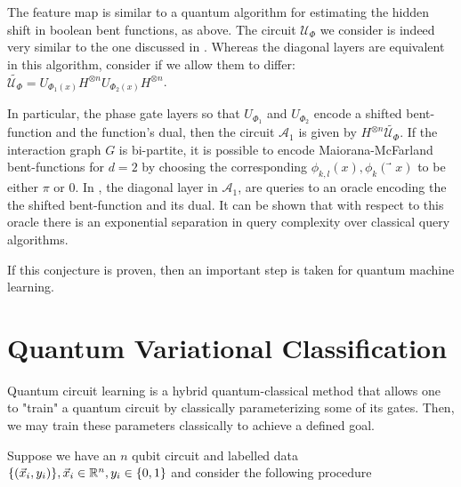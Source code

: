 \documentclass[main.tex]{subfiles}
\begin{document}
 The feature map is similar to a quantum algorithm for estimating the hidden shift in boolean bent functions, as above. The circuit $\mathcal{U}_\Phi$ we consider is indeed very similar to the one discussed in \cite{rotteler2010quantum}. Whereas the diagonal layers are equivalent in this algorithm, consider if we allow them to differ: $\tilde{\mathcal{U}_\Phi} = U_{\Phi_1(x)} H^{\otimes n} U_{\Phi_2(x)} H^{\otimes n}$. 
 
In particular, the phase gate layers so that $U_{\Phi_1}$ and $U_{\Phi_2}$ encode a shifted bent-function and the function’s dual, then the circuit $\mathcal{A}_1$ is given by $H^{\otimes n} \tilde{\mathcal{U}_\Phi}$. If the interaction graph $G$ is bi-partite, it is possible to encode Maiorana-McFarland bent-functions for $d = 2$ by choosing the corresponding $\phi_{k,l}(x),\phi_k(⃗x)$ to be either $\pi$ or $0$. In \cite{rotteler2010quantum}, the diagonal layer in $\mathcal{A}_1$, are queries to an oracle encoding the the shifted bent-function and its dual. It can be shown that with respect to this oracle there is an exponential separation in query complexity over classical query algorithms.
 
If this conjecture is proven, then an important step is taken for quantum machine learning.
 
\section{Quantum Variational Classification}

Quantum circuit learning is a hybrid quantum-classical method that allows one to "train" a quantum circuit by classically parameterizing some of its gates. Then, we may train these parameters classically to achieve a defined goal. 

Suppose we have an $n$ qubit circuit and labelled data $\{(\vec{x}_i, y_i) \}, \vec{x}_i \in \mathbb{R}^n, y_i \in \{0, 1\}$ and consider the following procedure
\end{document}
